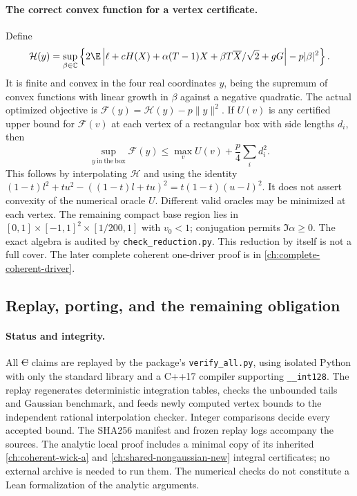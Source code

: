 \paragraph{The correct convex function for a vertex certificate.}
Define
\[
 \mathcal H(y)=\sup_{\beta\in\mathbb C}
 \left\{2\E\left|\ell+cH(X)+\alpha(T-1)X+
       \beta T\overline X/\sqrt2+gG\right|-p|\beta|^2\right\}.
\]
It is finite and convex in the four real coordinates $y$, being the supremum of convex functions with linear growth in $\beta$ against a negative quadratic. The actual optimized objective is $\mathcal F(y)=\mathcal H(y)-p\|y\|^2$.
If $U(v)$ is any certified upper bound for $\mathcal F(v)$ at each vertex of a rectangular box with side lengths $d_i$, then
\[
 \sup_{y\ \mathrm{in\ the\ box}}\mathcal F(y)
 \le\max_v U(v)+\frac p4\sum_i d_i^2.
\]
This follows by interpolating $\mathcal H$ and using the identity
$(1-t)l^2+tu^2-((1-t)l+tu)^2=t(1-t)(u-l)^2$.
It does not assert convexity of the numerical oracle $U$. Different valid oracles may be minimized at each vertex.
The remaining compact base region lies in
$[0,1]\times[-1,1]^2\times[1/200,1]$ with $v_0<1$; conjugation permits $\Im\alpha\ge0$. The exact algebra is audited by \texttt{check\_reduction.py}. This reduction by itself is not a full cover. The later complete coherent one-driver proof is in \autoref{ch:complete-coherent-driver}.


\subsection{Replay, porting, and the remaining obligation}
\paragraph{Status and integrity.}
All \st{C} claims are replayed by the package's \texttt{verify\_all.py},
using isolated Python with only the standard library and a C++17 compiler
supporting \texttt{\_\_int128}. The replay regenerates deterministic
integration tables, checks the unbounded tails and Gaussian benchmark,
and feeds newly computed vertex bounds to the independent rational
interpolation checker. Integer comparisons decide every accepted bound.
The SHA256 manifest and frozen replay logs accompany the sources.
The analytic local proof includes a minimal copy of its inherited
\autoref{ch:coherent-wick-a} and \autoref{ch:shared-nongaussian-new} integral certificates; no external archive is needed to
run them. The numerical checks do not constitute a Lean formalization
of the analytic arguments.

